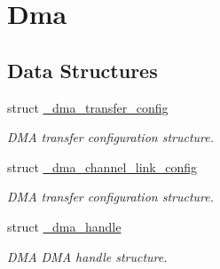 \hypertarget{group__dma}{}\section{Dma}
\label{group__dma}
\subsection*{Data Structures}
\begin{DoxyCompactItemize}
\item 
struct \mbox{\hyperlink{struct__dma__transfer__config}{\+\_\+dma\+\_\+transfer\+\_\+config}}
\begin{DoxyCompactList}\small\item\em D\+MA transfer configuration structure. \end{DoxyCompactList}\item 
struct \mbox{\hyperlink{struct__dma__channel__link__config}{\+\_\+dma\+\_\+channel\+\_\+link\+\_\+config}}
\begin{DoxyCompactList}\small\item\em D\+MA transfer configuration structure. \end{DoxyCompactList}\item 
struct \mbox{\hyperlink{struct__dma__handle}{\+\_\+dma\+\_\+handle}}
\begin{DoxyCompactList}\small\item\em D\+MA D\+MA handle structure. \end{DoxyCompactList}\end{DoxyCompactItemize}
